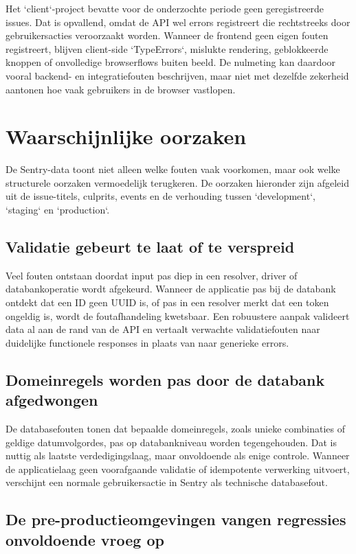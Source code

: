 Het `client`-project bevatte voor de onderzochte periode geen geregistreerde issues. Dat is opvallend, omdat de API wel errors registreert die rechtstreeks door gebruikersacties veroorzaakt worden. Wanneer de frontend geen eigen fouten registreert, blijven client-side `TypeErrors`, mislukte rendering, geblokkeerde knoppen of onvolledige browserflows buiten beeld. De nulmeting kan daardoor vooral backend- en integratiefouten beschrijven, maar niet met dezelfde zekerheid aantonen hoe vaak gebruikers in de browser vastlopen.

\section{Waarschijnlijke oorzaken}

De Sentry-data toont niet alleen welke fouten vaak voorkomen, maar ook welke structurele oorzaken vermoedelijk terugkeren. De oorzaken hieronder zijn afgeleid uit de issue-titels, culprits, events en de verhouding tussen `development`, `staging` en `production`.

\subsection{Validatie gebeurt te laat of te verspreid}

Veel fouten ontstaan doordat input pas diep in een resolver, driver of databankoperatie wordt afgekeurd. Wanneer de applicatie pas bij de databank ontdekt dat een ID geen UUID is, of pas in een resolver merkt dat een token ongeldig is, wordt de foutafhandeling kwetsbaar. Een robuustere aanpak valideert data al aan de rand van de API en vertaalt verwachte validatiefouten naar duidelijke functionele responses in plaats van naar generieke errors.

\subsection{Domeinregels worden pas door de databank afgedwongen}

De databasefouten tonen dat bepaalde domeinregels, zoals unieke combinaties of geldige datumvolgordes, pas op databankniveau worden tegengehouden. Dat is nuttig als laatste verdedigingslaag, maar onvoldoende als enige controle. Wanneer de applicatielaag geen voorafgaande validatie of idempotente verwerking uitvoert, verschijnt een normale gebruikersactie in Sentry als technische databasefout.

\subsection{De pre-productieomgevingen vangen regressies onvoldoende vroeg op}


